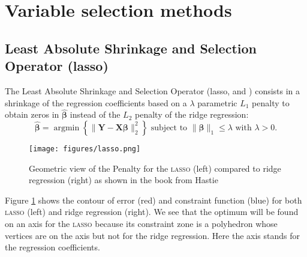 \documentclass[12pt,a4paper]{report}
\begin{document}
		 \FloatBarrier
	\section{Variable selection methods}
		\subsection{Least Absolute Shrinkage and Selection Operator ({\sc lasso})}		%

The Least Absolute Shrinkage and Selection Operator ({\sc lasso}, \cite{tibshirani1996regression} and \cite{tibshiranilasso}) consists in a shrinkage of the regression coefficients based on a $\lambda$ parametric $L_1$ penalty to obtain zeros in $\hat{\boldsymbol{\beta}}$ instead of the $L_2$ penalty of the ridge regression:
		\begin{equation}
		 \boldsymbol{\hat{\beta}}=\operatorname{argmin} \left\lbrace \parallel \boldsymbol{Y}-\boldsymbol{X\beta}\parallel_2^2 \right\rbrace \textrm{ subject to } \parallel\boldsymbol{\beta} \parallel_1\leq \lambda \textrm{ with } \lambda>0 . \nonumber 
		\end{equation}	
		
		\begin{figure}[h!]
			\centering
			\texttt{[image: figures/lasso.png]} 
			\caption{Geometric view of the Penalty for the \textsc{lasso} (left) compared to ridge regression (right) as shown in the book from Hastie \cite{hastie2009elements}} \label{lassogeom}
		\end{figure}
		Figure \ref{lassogeom} shows the contour of error (red) and constraint function (blue) for both \textsc{lasso} (left) and ridge regression (right). We see that the optimum will be found on an axis for the \textsc{lasso} because its constraint zone is a polyhedron whose vertices are on the axis but not for the ridge regression. Here the axis stands for the regression coefficients.\\
		
\end{document}
